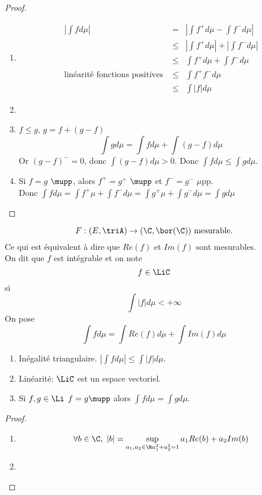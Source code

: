 \begin{proof}
	\begin{enumerate}
		\item  \begin{eqnarray*}
			      |\int f d\mu| &=& \left|\int f^+ d\mu - \int f^- d\mu \right| \\
			      &\leq& \left|\int f^+ d\mu \right| + \left|\int f^- d\mu \right| \\
			      &\leq& \int f^+ d\mu + \int f^- d\mu  \\
			      \text{linéarité fonctions positives } &\leq& \int f^+ f^- d\mu  \\
			      &\leq& \int |f| d\mu
		      \end{eqnarray*}
		\item %
		\item $f \leq g$, $g = f + (g-f)$
		      $$\int g d\mu = \int f d\mu + \int (g-f) d \mu$$
		      Or $(g-f)^- = 0$, donc $\int (g-f) d\mu > 0$.
		      Donc $\int f d\mu \leq \int g d\mu$.
		\item Si $f = g$ $\mupp$, alors $f^+ = g^+$ $\mupp$ et $f^- = g^-$ $\mu$pp.\\
		      Donc $\int f d\mu = \int f^+ \mu + \int f^-  d\mu = \int g^+ \mu + \int g^-  d\mu = \int g d\mu$
	\end{enumerate}
\end{proof}

\begin{definition}
	$$ F: (E, \triA) \to (\C, \bor(\C)) \text{ mesurable.}$$
	Ce qui est équivalent à dire que $Re(f)$ et $Im(f)$ sont mesurables.\\
	On dit que $f$ est intégrable et on note
	$$ f\in \LiC$$
	si $$\int |f| d\mu < +\infty$$
	On pose
	$$ \int f d\mu = \int Re(f) d\mu + \int Im(f) d\mu $$
\end{definition}


\begin{prop}
	\begin{enumerate}
		\item Inégalité triangulaire. $\left| \int f d\mu \right| \leq \int |f| d \mu$.
		\item Linéarité: $\LiC$ est un espace vectoriel.
		\item Si $f,g \in \Li$ $f = g \mupp$ alors $\int f d\mu = \int g d\mu$.
	\end{enumerate}
\end{prop}


\begin{proof}
	\begin{enumerate}
		\item $$\forall b \in \C, \ |b| = \sup_{a_1, a_2 \in \R \\ a_1^2 + a_2^2 = 1 } a_1 Re(b) + a_2 Im(b)$$
		\item
	\end{enumerate}
\end{proof}



